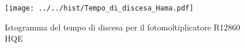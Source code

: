 \begin{figure}[h] \centering \texttt{[image: ../../hist/Tempo\_di\_discesa\_Hama.pdf]}\caption{Istogramma del tempo di discesa per il fotomoltiplicatore R12860 HQE}\label{hist:Tempo_di_discesa_Hama} \end{figure}
